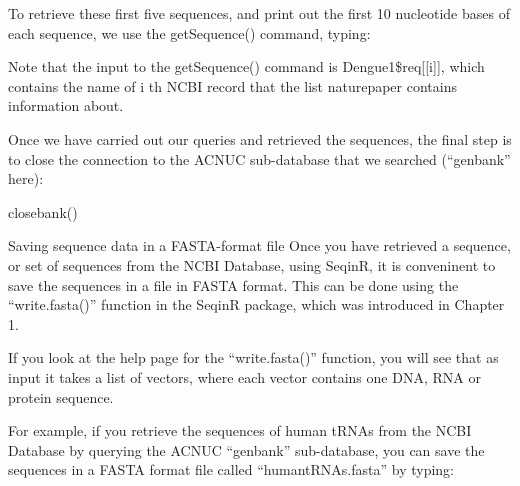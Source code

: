 \documentclass[
]{book}
\newenvironment{Shaded}{\begin{snugshade}}{\end{snugshade}}
\newcommand{\ControlFlowTok}[1]{\textcolor[rgb]{0.13,0.29,0.53}{\textbf{#1}}}
\newcommand{\DecValTok}[1]{\textcolor[rgb]{0.00,0.00,0.81}{#1}}
\newcommand{\FunctionTok}[1]{\textcolor[rgb]{0.00,0.00,0.00}{#1}}
\newcommand{\NormalTok}[1]{#1}
\newcommand{\OtherTok}[1]{\textcolor[rgb]{0.56,0.35,0.01}{#1}}
\newcommand{\SpecialCharTok}[1]{\textcolor[rgb]{0.00,0.00,0.00}{#1}}
\begin{document}
To retrieve these first five sequences, and print out the first 10 nucleotide bases of each sequence, we use the getSequence() command, typing:

\begin{Shaded}
\end{Shaded}

Note that the input to the getSequence() command is Dengue1\$req{[}{[}i{]}{]}, which contains the name of i th NCBI record that the list naturepaper contains information about.

Once we have carried out our queries and retrieved the sequences, the final step is to close the connection to the ACNUC sub-database that we searched (``genbank'' here):

\begin{Shaded}
\begin{Highlighting}[]
\FunctionTok{closebank}\NormalTok{()}
\end{Highlighting}
\end{Shaded}

Saving sequence data in a FASTA-format file
Once you have retrieved a sequence, or set of sequences from the NCBI Database, using SeqinR, it is conveninent to save the sequences in a file in FASTA format. This can be done using the ``write.fasta()'' function in the SeqinR package, which was introduced in Chapter 1.

If you look at the help page for the ``write.fasta()'' function, you will see that as input it takes a list of vectors, where each vector contains one DNA, RNA or protein sequence.

For example, if you retrieve the sequences of human tRNAs from the NCBI Database by querying the ACNUC ``genbank'' sub-database, you can save the sequences in a FASTA format file called ``humantRNAs.fasta'' by typing:
\end{document}
